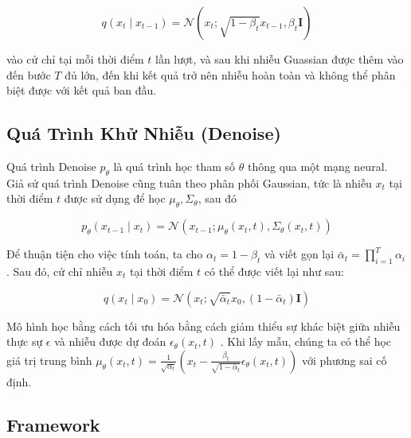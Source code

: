 \begin{equation} \label{eq:gaussian}
q\left(x_{t} \mid x_{t-1}\right)=\mathcal{N}\left(x_{t} ; \sqrt{1-\beta_{t}} x_{t-1}, \beta_{t} \mathbf{I}\right)
\end{equation}


vào cử chỉ tại mỗi thời điểm $t$ lần lượt, và sau khi nhiễu Guassian được thêm vào đến bước $T$ đủ lớn, đến khi kết quả trở nên nhiễu hoàn toàn và không thể phân biệt được với kết quả ban đầu.

\subsection{Quá Trình Khử Nhiễu (Denoise)}

Quá trình Denoise $p_{\theta}$ là quá trình học tham số $\theta$ thông qua một mạng neural. Giả sử quá trình Denoise cũng tuân theo phân phối Gaussian, tức là nhiễu $x_{t}$ tại thời điểm $t$ được sử dụng để học $\mu_{\theta}, \Sigma_{\theta}$, sau đó

\begin{equation} \label{eq:diffusion}
p_{\theta}\left(x_{t-1} \mid x_{t}\right)=\mathcal{N}\left(x_{t-1} ; \mu_{\theta}\left(x_{t}, t\right), \Sigma_{\theta}\left(x_{t}, t\right)\right)
\end{equation}


Để thuận tiện cho việc tính toán, ta cho $\alpha_{t}=1-\beta_{t}$ và viết gọn lại $\bar{\alpha}_{t}=\prod_{i=1}^{T} \alpha_{i}$. Sau đó, cử chỉ nhiễu $x_{t}$ tại thời điểm $t$ có thể được viết lại như sau:

\begin{equation} \label{eq:denoisevariance}
q\left(x_{t} \mid x_{0}\right)=\mathcal{N}\left(x_{t} ; \sqrt{\bar{\alpha}_{t}} x_{0},\left(1-\bar{\alpha}_{t}\right) \mathbf{I}\right)
\end{equation}


Mô hình học bằng cách tối ưu hóa bằng cách giảm thiểu sự khác biệt giữa nhiễu thực sự $\epsilon$ và nhiễu được dự đoán $\epsilon_{\theta}\left(x_{t}, t\right)$ \cite{ho2020denoising}. Khi lấy mẫu, chúng ta có thể học giá trị trung bình $\mu_{\theta}\left(x_{t}, t\right)=\frac{1}{\sqrt{\alpha_{t}}}\left(x_{t}-\frac{\beta_{t}}{\sqrt{1-\bar{\alpha}_{t}}} \epsilon_{\theta}\left(x_{t}, t\right)\right)$ với phương sai cố định.

\subsection{Framework}


